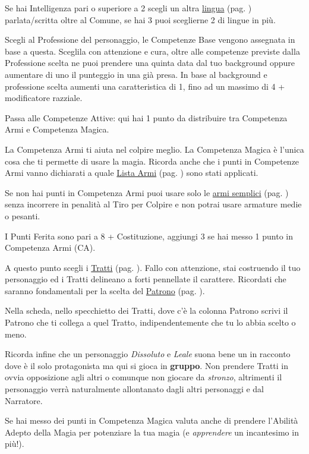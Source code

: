 \begin{multicols}{2}
Se hai Intelligenza pari o superiore a 2 scegli un altra \hyperlink{linguaggi}{lingua} (pag. \pageref{linguaggi}) parlata/scritta oltre al Comune, se hai 3 puoi sceglierne 2 di lingue in più.

Scegli al Professione del personaggio, le Competenze Base vengono assegnata in base a questa. Sceglila con attenzione e cura, oltre alle competenze previste dalla Professione scelta ne puoi prendere una quinta data dal tuo background oppure aumentare di uno il punteggio in una già presa.
In base al background e professione scelta aumenti una caratteristica di 1, fino ad un massimo di 4 + modificatore razziale.

Passa alle Competenze Attive: qui hai 1 punto  da distribuire tra Competenza Armi e Competenza Magica.

La Competenza Armi ti aiuta nel colpire meglio. La Competenza Magica è l'unica cosa che ti permette di usare la magia. Ricorda anche che i punti in Competenze Armi vanno dichiarati a quale \hyperlink{lista.armi}{Lista Armi} (pag. \pageref{lista.armi}) sono stati applicati.

Se non hai punti in Competenza Armi puoi usare solo le \hyperlink{armi.semplici}{armi semplici} (pag. \pageref{listaarmisemplice}) senza incorrere in penalità al Tiro per Colpire e non potrai usare armature medie o pesanti.

I Punti Ferita sono pari a 8 + Costituzione, aggiungi 3 se hai messo 1 punto in Competenza Armi (CA).

A questo punto scegli i \hyperlink{tratti}{Tratti} (pag. \pageref{tratti}). Fallo con attenzione, stai costruendo il tuo personaggio ed i Tratti delineano a forti pennellate il carattere. Ricordati che saranno fondamentali per la scelta del \hyperlink{patroni}{Patrono} (pag. \pageref{patroni}).

Nella scheda, nello specchietto dei Tratti, dove c'è la colonna Patrono scrivi il Patrono che ti collega a quel Tratto, indipendentemente che tu lo abbia scelto o meno.

Ricorda infine che un personaggio \emph{Dissoluto} e \emph{Leale} suona bene un in racconto dove è il solo protagonista ma qui si gioca in \textbf{gruppo}. Non prendere Tratti in ovvia opposizione agli altri o comunque non giocare da \emph{stronzo}, altrimenti il personaggio verrà naturalmente allontanato dagli altri personaggi e dal Narratore.

Se hai messo dei punti in Competenza Magica valuta anche di prendere l'Abilità Adepto della Magia per potenziare la tua magia (e \emph{apprendere} un incantesimo in più!).


\end{multicols}
